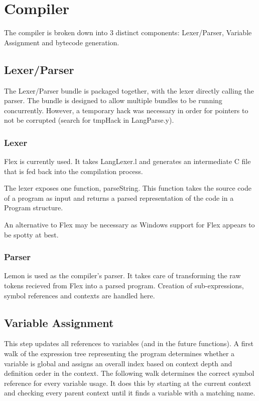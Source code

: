 \documentclass{standalone}
\begin{document}
\chapter{Compiler}
	The compiler is broken down into 3 distinct components: Lexer/Parser, Variable Assignment and bytecode generation.

	\section{Lexer/Parser}
		The Lexer/Parser bundle is packaged together, with the lexer directly calling the parser. The bundle is designed to allow multiple bundles to be running concurrently. However, a temporary hack was necessary in order for pointers to not be corrupted (search for tmpHack in LangParse.y).
		\subsection{Lexer}
			Flex is currently used. It takes LangLexer.l and generates an intermediate C file that is fed back into the compilation process.

			The lexer exposes one function, parseString. This function takes the source code of a program as input and returns a parsed representation of the code in a Program structure.

			An alternative to Flex may be necessary as Windows support for Flex appears to be spotty at best.
		\subsection{Parser}
			Lemon is used as the compiler's parser. It takes care of transforming the raw tokens recieved from Flex into a parsed program. Creation of sub-expressions, symbol references and contexts are handled here.

	\section{Variable Assignment}
		This step updates all references to variables (and in the future functions). A first walk of the expression tree representing the program determines whether a variable is global and assigns an overall index based on context depth and definition order in the context. The following walk determines the correct symbol reference for every variable usage. It does this by starting at the current context and checking every parent context until it finds a variable with a matching name.
\end{document}
